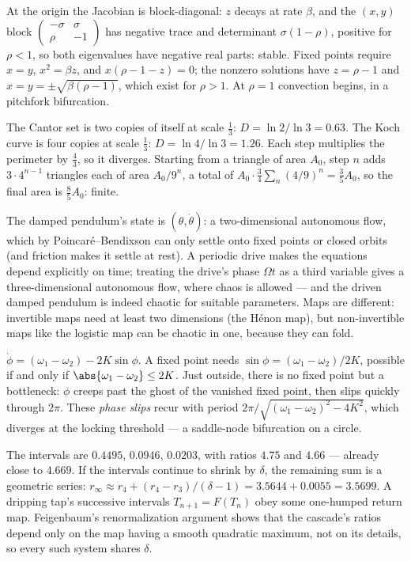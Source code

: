  At the origin the Jacobian is block-diagonal: $z$ decays at rate $\beta$, and the $(x,y)$ block $\begin{pmatrix}-\sigma&\sigma\\\rho&-1\end{pmatrix}$ has negative trace and determinant $\sigma(1-\rho)$, positive for $\rho<1$, so both eigenvalues have negative real parts: stable. Fixed points require $x = y$, $x^2 = \beta z$, and $x(\rho - 1 - z) = 0$; the nonzero solutions have $z = \rho - 1$ and $x = y = \pm\sqrt{\beta(\rho-1)}$, which exist for $\rho>1$. At $\rho = 1$ convection begins, in a pitchfork bifurcation.

 The Cantor set is two copies of itself at scale $\tfrac13$: $D = \ln2/\ln3 = 0.63$. The Koch curve is four copies at scale $\tfrac13$: $D = \ln4/\ln3 = 1.26$. Each step multiplies the perimeter by $\tfrac43$, so it diverges. Starting from a triangle of area $A_0$, step $n$ adds $3\cdot4^{n-1}$ triangles each of area $A_0/9^n$, a total of $A_0\cdot\tfrac34\sum_n(4/9)^n = \tfrac35A_0$, so the final area is $\tfrac85A_0$: finite.

 The damped pendulum's state is $(\theta,\dot\theta)$: a two-dimensional autonomous flow, which by Poincar\'e--Bendixson can only settle onto fixed points or closed orbits (and friction makes it settle at rest). A periodic drive makes the equations depend explicitly on time; treating the drive's phase $\Omega t$ as a third variable gives a three-dimensional autonomous flow, where chaos is allowed --- and the driven damped pendulum is indeed chaotic for suitable parameters. Maps are different: invertible maps need at least two dimensions (the H\'enon map), but non-invertible maps like the logistic map can be chaotic in one, because they can fold.

 $\dot\phi = (\omega_1-\omega_2) - 2K\sin\phi$. A fixed point needs $\sin\phi = (\omega_1-\omega_2)/2K$, possible if and only if $\abs{\omega_1-\omega_2}\le2K$. Just outside, there is no fixed point but a bottleneck: $\phi$ creeps past the ghost of the vanished fixed point, then slips quickly through $2\pi$. These \emph{phase slips} recur with period $2\pi/\sqrt{(\omega_1-\omega_2)^2-4K^2}$, which diverges at the locking threshold --- a saddle-node bifurcation on a circle.

 The intervals are $0.4495$, $0.0946$, $0.0203$, with ratios $4.75$ and $4.66$ --- already close to $4.669$. If the intervals continue to shrink by $\delta$, the remaining sum is a geometric series: $r_\infty\approx r_4 + (r_4-r_3)/(\delta-1) = 3.5644 + 0.0055 = 3.5699$. A dripping tap's successive intervals $T_{n+1} = F(T_n)$ obey some one-humped return map. Feigenbaum's renormalization argument shows that the cascade's ratios depend only on the map having a smooth quadratic maximum, not on its details, so every such system shares $\delta$.
